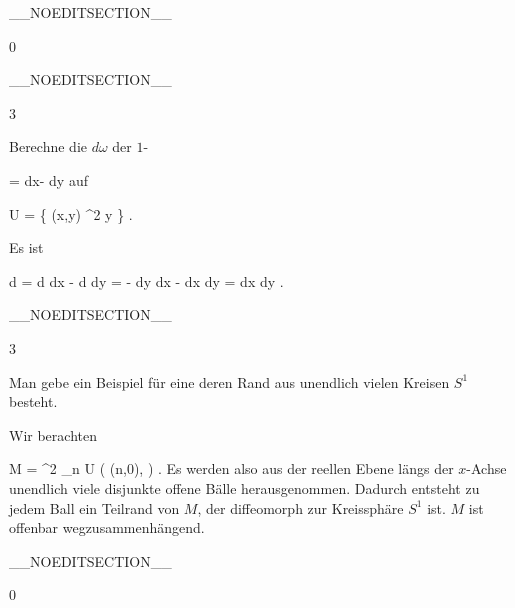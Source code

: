 __NOEDITSECTION__

{0}

{

}
{  }

__NOEDITSECTION__

{3}

{

Berechne die
$d \omega$ der
$1$-

\mavergleichskettedisp
{\vergleichskette
{ \omega
}
{ =} { {  } dx- {  } dy
}
{ } {
}
{ } {
}
{ } {
}
}
{}{}{}
auf

\mavergleichskette
{\vergleichskette
{ U
}
{ = }{ \left\{ (x,y) \in \R^2  \mid   y          \right\}
}
{  }{
}
{    }{
}
{   }{
}
}
{}{}{.}

}
{

Es ist

\mavergleichskettealign
{\vergleichskettealign
{d \omega
}
{ =} { d {  } \wedge dx - d {  } \wedge dy
}
{ =} { - {  } dy  \wedge dx  -   {  }  dx \wedge dy
}
{ =} { {  }  dx \wedge dy
}
{ } {
}
}
{}
{}{.}

 }

__NOEDITSECTION__

{3}

{

Man gebe ein Beispiel für eine
deren Rand aus
 {} {}
unendlich vielen Kreisen $S^1$ besteht.

}
{

Wir berachten

\mavergleichskettedisp
{\vergleichskette
{ M
}
{ =} { \R^2 \setminus \biguplus_{n \in \Z} U \left(  (n,0), {  }   \right)
}
{ } {
}
{ } {
}
{ } {
}
}
{}{}{.}
Es werden also aus der reellen Ebene längs der $x$-Achse unendlich viele disjunkte offene Bälle herausgenommen. Dadurch entsteht zu jedem Ball ein Teilrand von $M$, der diffeomorph zur Kreissphäre $S^1$ ist. $M$ ist offenbar wegzusammenhängend.

 }

__NOEDITSECTION__

{0}

